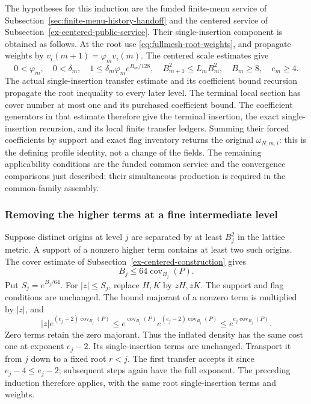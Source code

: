 The hypotheses for this induction are the funded finite-menu service
of Subsection~\ref{sec:finite-menu-history-handoff} and the centered
service of Subsection~\ref{ex-centered-public-service}. Their
single-insertion component is obtained as follows. At the root use
\eqref{eq:fullmesh-root-weights}, and propagate weights by
$v_i(m+1)=\varphi_m v_i(m)$. The centered scale estimates give
\[
 0<\varphi_m,\quad 0<\delta_m,\quad
 1\le\delta_m\varphi_m e^{B_m/128},\quad
 B_{m+1}^2\le L_m B_m^2,\quad B_m\ge8,\quad e_m\ge4.
\]
The actual single-insertion transfer estimate and its coefficient
bound recursion propagate the root inequality to every later level.
The terminal local section has cover number at most one and its
purchased coefficient bound. The coefficient generators in that
estimate therefore give the terminal insertion, the exact
single-insertion recursion, and its local finite transfer ledgers.
Summing their forced coefficients by support and exact flag inventory
returns the original $\omega_{N,m,i}$: this is the defining profile
identity, not a change of the fields. The remaining applicability
conditions are the funded common service and the convergence
comparisons just described; their simultaneous production is required
in the common-family assembly.

\subsubsection{Removing the higher terms at a fine intermediate level}
Suppose distinct origins at level $j$ are separated by at least $B_j^2$
in the lattice metric. A support of a nonzero higher term contains
at least two such origins. The cover estimate of
Subsection~\ref{ex-centered-construction} gives
\[
 B_j\le64\operatorname{cov}_{B_j}(P).
\]
Put $S_j=e^{B_j/64}$. For $|z|\le S_j$, replace $H,K$ by $zH,zK$.
The support and flag conditions are unchanged. The bound majorant
of a nonzero term is multiplied by $|z|$, and
\begin{equation}\label{eq:fullmesh-inflation}
 |z|e^{(e_j-2)\operatorname{cov}_{B_j}(P)}
 \le e^{\operatorname{cov}_{B_j}(P)}
           e^{(e_j-2)\operatorname{cov}_{B_j}(P)}
 \le e^{e_j\operatorname{cov}_{B_j}(P)}.
\end{equation}
Zero terms retain the zero majorant. Thus the inflated density has
the same cost one at exponent $e_j-2$. Its single-insertion terms
are unchanged. Transport it from $j$ down to a fixed root $r<j$.
The first transfer accepts it since $e_j-4\le e_j-2$; subsequent
steps again have the full exponent. The preceding induction therefore
applies, with the same root single-insertion terms and weights.


